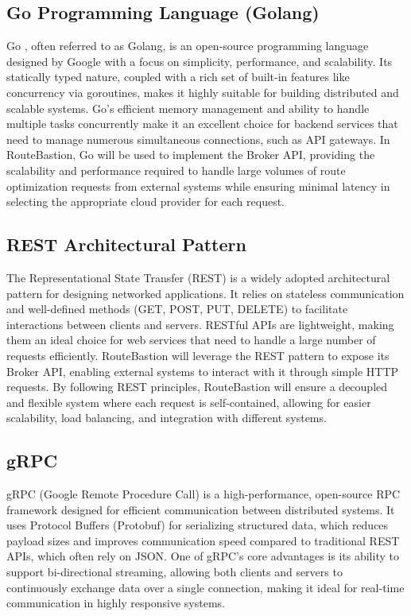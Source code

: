 \subsection{Go Programming Language (Golang)}
\label{subsec:go_programming_language}
Go \cite{gopl}, often referred to as Golang, is an open-source programming language designed by Google with a focus on simplicity, performance, and scalability. Its statically typed nature, coupled with a rich set of built-in features like concurrency via goroutines, makes it highly suitable for building distributed and scalable systems. Go’s efficient memory management and ability to handle multiple tasks concurrently make it an excellent choice for backend services that need to manage numerous simultaneous connections, such as API gateways. In RouteBastion, Go will be used to implement the Broker API, providing the scalability and performance required to handle large volumes of route optimization requests from external systems while ensuring minimal latency in selecting the appropriate cloud provider for each request.

\subsection{REST Architectural Pattern}
\label{subsec:rest}
The Representational State Transfer (REST) is a widely adopted architectural pattern for designing networked applications. It relies on stateless communication and well-defined methods (GET, POST, PUT, DELETE) to facilitate interactions between clients and servers. RESTful APIs are lightweight, making them an ideal choice for web services that need to handle a large number of requests efficiently. RouteBastion will leverage the REST pattern to expose its Broker API, enabling external systems to interact with it through simple HTTP requests. By following REST principles, RouteBastion will ensure a decoupled and flexible system where each request is self-contained, allowing for easier scalability, load balancing, and integration with different systems.

\subsection{gRPC}
\label{subsec:grpc}
gRPC (Google Remote Procedure Call) \cite{grpc} is a high-performance, open-source RPC framework designed for efficient communication between distributed systems. It uses Protocol Buffers (Protobuf) for serializing structured data, which reduces payload sizes and improves communication speed compared to traditional REST APIs, which often rely on JSON. One of gRPC's core advantages is its ability to support bi-directional streaming, allowing both clients and servers to continuously exchange data over a single connection, making it ideal for real-time communication in highly responsive systems.

